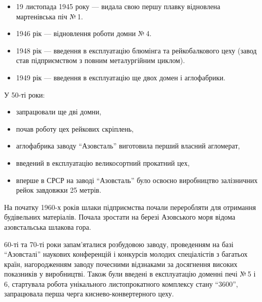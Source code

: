 
\begin{itemize} %
\item 19 листопада 1945 року — видала свою першу плавку відновлена мартенівська піч № 1.
\item 1946 рік — відновлення роботи домни № 4.
\item 1948 рік — введення в експлуатацію блюмінга та рейкобалкового цеху (завод став підприємством з повним металургійним циклом).
\item 1949 рік — введення в експлуатацію ще двох домен і аглофабрики.
\end{itemize} %


У 50-ті роки:

\begin{itemize} %
\item запрацювали ще дві домни,
\item почав роботу цех рейкових скріплень,
\item аглофабрика заводу \enquote{Азовсталь} виготовила перший власний агломерат,
\item введений в експлуатацію великосортний прокатний цех,
\item вперше в СРСР на заводі \enquote{Азовсталь} було освоєно виробництво залізничних рейок завдовжки 25 метрів.
\end{itemize} %

На початку 1960-х років шлаки підприємства почали переробляти для отримання
будівельних матеріалів. Почала зростати на березі Азовського моря відома
азовстальська шлакова гора.

60-ті та 70-ті роки запам'яталися розбудовою заводу, проведенням на базі
\enquote{Азовсталі} наукових конференцій і конкурсів молодих спеціалістів з багатьох
країн, нагородженням заводу почесними відзнаками за досягнення високих
показників у виробництві. Також були введені в експлуатацію доменні печі № 5 і
6, стартувала робота унікального листопрокатного комплексу стану \enquote{3600},
запрацювала перша черга киснево-конвертерного цеху.


